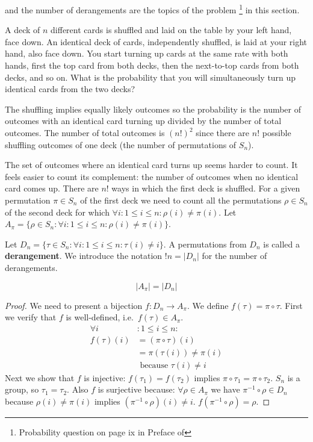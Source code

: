  and the number of derangements are the topics of the problem \footnote{Probability question on page ix in Preface of } in this section.

\vspace{10 mm}
\begin{problem}
A deck of $n$ different cards is shuffled and laid on the table by your left hand, face down. An identical deck of cards, independently shuffled, is laid at your right hand, also face down. You start turning up cards at the same rate with both hands, first the top card from both decks, then the next-to-top cards from both decks, and so on. What is the probability that you will simultaneously turn up identical cards from the two decks?
\end{problem}

The shuffling implies equally likely outcomes so the probability is the number of outcomes with an identical card turning up divided by the number of total outcomes. The number of total outcomes is $(n!)^2$ since there are $n!$ possible shuffling outcomes of one deck (the number of permutations of $S_n$).

The set of outcomes where an identical card turns up seems harder to count. It feels easier to count its complement: the number of outcomes when no identical card comes up. There are $n!$ ways in which the first deck is shuffled. For a given permutation $\pi \in S_n$ of the first deck we need to count all the permutations $\rho \in S_n$ of the second deck for which $\forall i: 1 \leq i \leq n: \rho(i) \neq \pi(i)$. Let $A_{\pi} = \{\rho \in S_n: \forall i: 1 \leq i \leq n: \rho(i) \neq \pi(i) \}$.

Let $D_n = \{\tau \in S_n: \forall i: 1 \leq i \leq n: \tau(i) \neq i \}$. A permutations from $D_n$ is called a \textbf{derangement}. We introduce the notation $!n = |D_n|$ for the number of derangements.

\begin{lem}\label{derangementEquivalent}
$$
|A_{\pi}| = |D_n|
$$
\end{lem}

\begin{proof}
We need to present a bijection $f: D_n \rightarrow A_{\pi}$. We define $f(\tau) = \pi \circ \tau$. First we verify that $f$ is well-defined, i.e.\  $f(\tau) \in A_{\pi}$.
\begin{align*}
\forall i&: 1 \leq i \leq n:\\
   f(\tau)(i) &= (\pi \circ \tau)(i)\\
              &= \pi(\tau(i)) \neq \pi(i)\\
              &\text{ because } \tau(i) \neq i	
\end{align*}
Next we show that $f$ is injective: $f(\tau_1) = f(\tau_2)$ implies $\pi \circ \tau_1 = \pi \circ \tau_2$. $S_n$ is a group, so $\tau_1 = \tau_2$.
Also $f$ is surjective because: $\forall \rho \in A_{\pi}$ we have $\pi^{-1} \circ \rho \in D_n$ because $\rho(i) \neq \pi(i)$ implies $(\pi^{-1} \circ \rho)(i) \neq i$. $f(\pi^{-1} \circ \rho)=\rho$.
\end{proof}


